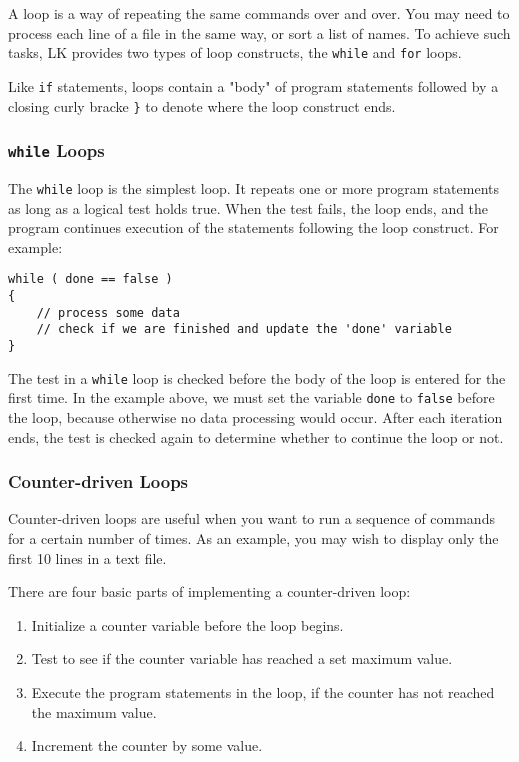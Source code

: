 \documentclass{article}
\begin{document}
A loop is a way of repeating the same commands over and over.  You may need to process each line of a file in the same way, or sort a list of names.  To achieve such tasks, LK provides two types of loop constructs, the \texttt{while} and \texttt{for} loops.  

Like \texttt{if} statements, loops contain a "body" of program statements followed by a closing curly bracke \texttt{\}} to denote where the loop construct ends.

\subsubsection{\texttt{while} Loops}

The \texttt{while} loop is the simplest loop.  It repeats one or more program statements as long as a logical test holds true.  When the test fails, the loop ends, and the program continues execution of the statements following the loop construct.  For example:

\begin{verbatim}
while ( done == false )
{
    // process some data
    // check if we are finished and update the 'done' variable
}
\end{verbatim}

The test in a \texttt{while} loop is checked before the body of the loop is entered for the first time.  In the example above, we must set the variable \texttt{done} to \texttt{false} before the loop, because otherwise no data processing would occur.  After each iteration ends, the test is checked again to determine whether to continue the loop or not.

\subsubsection{Counter-driven Loops}

Counter-driven loops are useful when you want to run a sequence of commands for a certain number of times.  As an example, you may wish to display only the first 10 lines in a text file.

There are four basic parts of implementing a counter-driven loop:

\begin{enumerate}
\item Initialize a counter variable before the loop begins.
\item Test to see if the counter variable has reached a set maximum value.
\item Execute the program statements in the loop, if the counter has not reached the maximum value.
\item Increment the counter by some value.
\end{enumerate}
\end{document}
